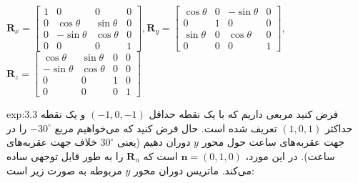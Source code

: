 {\begin{spacing}{1.5}
        \begin{center}
            $\textbf{R}_{x}=\begin{bmatrix}
                                1 & 0           & 0          & 0 \\
                                0 & \cos\theta  & \sin\theta & 0 \\
                                0 & -\sin\theta & \cos\theta & 0 \\
                                0 & 0           & 0          & 1
            \end{bmatrix}, \textbf{R}_{y}=\begin{bmatrix}
                                              \cos\theta & 0 & -\sin\theta & 0 \\
                                              0          & 1 & 0           & 0 \\
                                              \sin\theta & 0 & \cos\theta  & 0 \\
                                              0          & 0 & 0           & 1
            \end{bmatrix},$\\$\textbf{R}_{z}=\begin{bmatrix}
                                                 \cos\theta  & \sin\theta & 0 & 0 \\
                                                 -\sin\theta & \cos\theta & 0 & 0 \\
                                                 0           & 0          & 1 & 0 \\
                                                 0           & 0          & 0 & 1
            \end{bmatrix}$
        \end{center}

        \begin{example}{exp:3.3}
            \Large
            فرض کنید مربعی داریم که با یک نقطه حداقل $(-1, 0, -1)$ و یک نقطه حداکثر $(1, 0, 1)$ تعریف شده است.
            حال فرض کنید که می‌خواهیم مربع $-30^\circ$ را در جهت عقربه‌های ساعت حول محور $y$ دوران دهیم (یعنی $30^\circ$ خلاف جهت عقربه‌های ساعت).
            در این مورد، $\textbf{n}=(0,1,0)$ است که $\textbf{R}_{n}$ را به طور قابل توجهی ساده می‌کند.
            ماتریس دوران محور $y$  مربوطه به صورت زیر است:


\end{example}
\end{spacing}}
